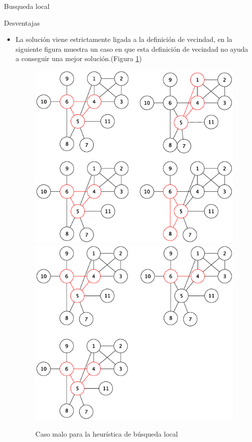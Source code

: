\begin{section}{Busqueda local}
\begin{subsection}{Desventajas}
\begin{itemize}
				\item La solución viene estrictamente ligada a la definición de vecindad, en la siguiente figura muestra un caso en que esta definición de vecindad no ayuda a conseguir una mejor solución.(Figura \ref{fig:seguimiento_caso_malo_busqueda_local2})

					\begin{figure}[H]
						\centering
				    	\includegraphics[scale=0.5]{busqueda_local/segCasoMalo2.eps}
					\includegraphics[scale=0.5]{busqueda_local/segCasoMalo2_cont.eps}
					    \caption{Caso malo para la heurística de búsqueda local}
					    \label{fig:seguimiento_caso_malo_busqueda_local2}
					\end{figure}


\end{itemize}
\end{subsection}
\end{section}
